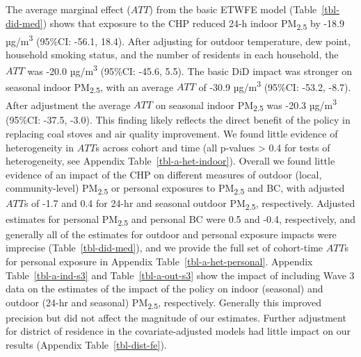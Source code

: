 \documentclass[
  letterpaper,
  DIV=11,
  numbers=noendperiod]{scrartcl}
\begin{document}
The average marginal effect (\(ATT\)) from the basic ETWFE model
(Table~\ref{tbl-did-med}) shows that exposure to the CHP reduced 24-h
indoor PM\textsubscript{2.5} by -18.9 µg/m\textsuperscript{3} (95\%CI:
-56.1, 18.4). After adjusting for outdoor temperature, dew point,
household smoking status, and the number of residents in each household,
the \(ATT\) was -20.0 µg/m\textsuperscript{3} (95\%CI: -45.6, 5.5). The
basic DiD impact was stronger on seasonal indoor PM\textsubscript{2.5},
with an average \(ATT\) of -30.9 µg/m\textsuperscript{3} (95\%CI: -53.2,
-8.7). After adjustment the average \(ATT\) on seasonal indoor
PM\textsubscript{2.5} was -20.3 µg/m\textsuperscript{3} (95\%CI: -37.5,
-3.0). This finding likely reflects the direct benefit of the policy in
replacing coal stoves and air quality improvement. We found
little evidence of heterogeneity in \(ATT\)s across
cohort and time (all p-values \textgreater{} 0.4 for tests of
heterogeneity, see Appendix Table~\ref{tbl-a-het-indoor}). Overall we
found little evidence of an impact of the CHP on different measures of
outdoor (local, community-level) PM\textsubscript{2.5} or personal
exposures to PM\textsubscript{2.5} and BC, with adjusted \(ATT\)s of
-1.7 and 0.4 for 24-hr and seasonal outdoor PM\textsubscript{2.5},
respectively. Adjusted estimates for personal PM\textsubscript{2.5} and
personal BC were 0.5 and -0.4, respectively, and generally all of the
estimates for outdoor and personal exposure impacts were imprecise
(Table~\ref{tbl-did-med}), and we provide the full set of cohort-time
\(ATT\)s for personal exposure in Appendix
Table~\ref{tbl-a-het-personal}. Appendix Table~\ref{tbl-a-ind-s3} and
Table~\ref{tbl-a-out-s3} show the impact of including Wave 3 data on the
estimates of the impact of the policy on indoor (seasonal) and outdoor
(24-hr and seasonal) PM\textsubscript{2.5}, respectively. Generally this
improved precision but did not affect the magnitude of our estimates.
Further adjustment for district of residence in the
covariate-adjusted models had little impact on our results (Appendix
Table~\ref{tbl-dist-fe}).
\end{document}
